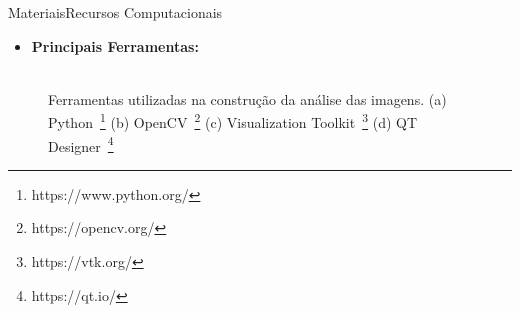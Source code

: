 \documentclass{beamer}
\begin{document}
\begin{frame}{Materiais}{Recursos Computacionais}
  \begin{itemize}
      \item \textbf{Principais Ferramentas:}
  \end{itemize}  
    \begin{figure}[!htb]
        \centering
         \hspace*{0.3cm}
        \hspace*{0.3cm}
         \hspace*{0.3cm}
         \hspace*{0.3cm}
        \\
         \scriptsize{Ferramentas utilizadas na construção da análise das imagens. (a) Python~\protect\footnote{https://www.python.org/} (b) OpenCV~\protect\footnote{https://opencv.org/} (c) Visualization Toolkit~\protect\footnote{https://vtk.org/} (d) QT Designer~\protect\footnote{https://qt.io/}}
        
    \end{figure}
\end{frame}
\end{document}
